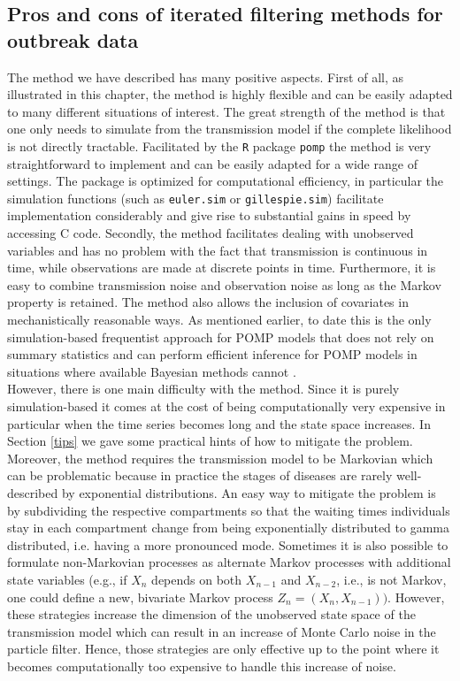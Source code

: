 \subsection{Pros and cons of iterated filtering methods for outbreak data}
The method we have described has many positive aspects. First of all, as illustrated in this chapter, the method is highly flexible and can be easily adapted to many different situations of interest.
The great strength of the method is that one only needs to simulate from the transmission model if the complete likelihood is not directly tractable. Facilitated by the \texttt{R} package \texttt{pomp}  the method is very straightforward to implement and can be easily adapted for a wide range of settings. The package is  optimized for computational efficiency, in particular the simulation functions (such as \texttt{euler.sim} or \texttt{gillespie.sim})   facilitate implementation considerably and  give rise to   substantial   gains in speed by accessing C code. Secondly, the method facilitates dealing with unobserved variables  and has no problem with the fact that transmission is continuous in time, while observations are made at discrete points in time.  Furthermore, it is easy to combine  transmission noise and observation noise as long as the Markov property is retained.
The method also allows the inclusion of  covariates in mechanistically reasonable ways. 
As mentioned earlier,  to date this is the only simulation-based frequentist approach for POMP models that does not rely on summary statistics  and can perform  efficient  inference for POMP models in situations where available Bayesian methods cannot \citep{Ionides2015}.\\
However, there is one main difficulty with the method. Since it is purely simulation-based it comes at the cost of being computationally very expensive in particular when  the time series becomes long and the state space increases. In Section \ref{tips} we gave some practical hints of how to mitigate the problem. Moreover, the method requires the transmission model to be Markovian which can be problematic because in practice the stages of diseases are rarely well-described by exponential distributions. An easy way to mitigate the problem is by subdividing the respective compartments so that the waiting times individuals stay in each compartment change from being exponentially distributed to gamma distributed, i.e. having a more pronounced mode. 
Sometimes it is also possible to formulate non-Markovian processes as alternate Markov processes with additional state variables (e.g., if $X_n$ depends on both $X_{n-1}$ and $X_{n-2}$, i.e., is not Markov, one could define a new, bivariate Markov process $Z_n = (X_{n},X_{n-1}))$. However, these strategies increase the dimension of the unobserved state space of the transmission model which can result in an increase of Monte Carlo noise in the particle filter. Hence, those strategies are only effective up to the point where it becomes  computationally too expensive to handle this increase of noise.  

